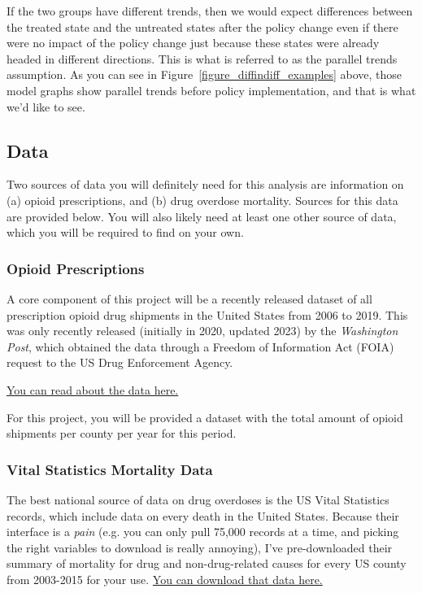 \documentclass[12pt]{article}
\begin{document}
If the two groups have different trends, then we would expect differences between the treated state and the untreated states after the policy change even if there were no impact of the policy change just because these states were already headed in different directions.  This is what is referred to as the parallel trends assumption. As you can see in Figure~\ref{figure_diffindiff_examples} above, those model graphs show parallel trends before policy implementation, and that is what we'd like to see.



\subsection*{Data}

Two sources of data you will definitely need for this analysis are information on (a) opioid prescriptions, and (b) drug overdose mortality. Sources for this data are provided below. You will also likely need at least one other source of data, which you will be required to find on your own.

\subsubsection*{Opioid Prescriptions}

A core component of this project will be a recently released dataset of all prescription opioid drug shipments in the United States from 2006 to 2019. This was only recently released (initially in 2020, updated 2023) by the \emph{Washington Post}, which obtained the data through a Freedom of Information Act (FOIA) request to the US Drug Enforcement Agency.

\href{https://github.com/nickeubank/practicaldatascience_book/blob/main/ids720_specific/opioids/MoreThan100billionPainPillsSaturatedTheNationOverNineYears.pdf}{You can read about the data here.}

For this project, you will be provided a dataset with the total amount of opioid shipments per county per year for this period.

\subsubsection*{Vital Statistics Mortality Data}

The best national source of data on drug overdoses is the US Vital Statistics records, which include data on every death in the United States. Because their interface is a \emph{pain} (e.g. you can only pull 75,000 records at a time, and picking the right variables to download is really annoying), I've pre-downloaded their summary of mortality for drug and non-drug-related causes for every US county from 2003-2015 for your use. \href{https://www.dropbox.com/s/kad4dwebr88l3ud/US_VitalStatistics.zip?dl=0}{You can download that data here.}
\end{document}
